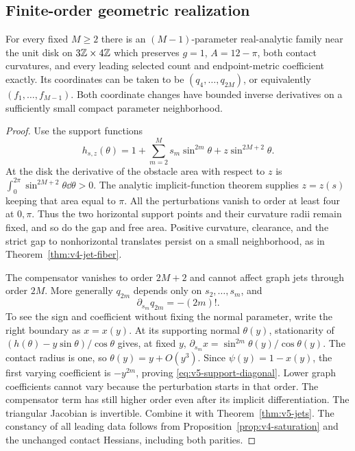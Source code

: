 \subsection{Finite-order geometric realization}
\begin{theorem}
\label{thm:v5-realization}
For every fixed $M\ge2$ there is an $(M-1)$-parameter real-analytic
family near the unit disk on $3\mathbb Z\times4\mathbb Z$ which preserves
$g=1$, $A=12-\pi$, both contact curvatures, and every leading selected
count and endpoint-metric coefficient exactly. Its coordinates can be
taken to be $(q_4,\ldots,q_{2M})$, or equivalently
$(f_1,\ldots,f_{M-1})$. Both coordinate changes have bounded inverse
derivatives on a sufficiently small compact parameter neighborhood.
\end{theorem}
\begin{proof}
Use the support functions
\[
 h_{s,z}(\theta)=1+\sum_{m=2}^M s_m\sin^{2m}\theta
                         +z\sin^{2M+2}\theta.
\]
At the disk the derivative of the obstacle area with respect to $z$ is
$\int_0^{2\pi}\sin^{2M+2}\theta\dd\theta>0$. The analytic implicit-function
theorem supplies $z=z(s)$ keeping that area equal to $\pi$. All the
perturbations vanish to order at least four at $0,\pi$. Thus the two
horizontal support points and their curvature radii remain fixed, and
so do the gap and free area. Positive curvature, clearance, and the
strict gap to nonhorizontal translates persist on a small neighborhood,
as in Theorem~\ref{thm:v4-jet-fiber}.

The compensator vanishes to order $2M+2$ and cannot affect graph jets
through order $2M$. More generally $q_{2m}$ depends only on
$s_2,\ldots,s_m$, and
\begin{equation}\label{eq:v5-support-diagonal}
                 \partial_{s_m}q_{2m}=-(2m)!.
\end{equation}
To see the sign and coefficient without fixing the normal parameter,
write the right boundary as $x=x(y)$. At its supporting normal
$\theta(y)$, stationarity of
$(h(\theta)-y\sin\theta)/\cos\theta$ gives, at fixed $y$,
$\partial_{s_m}x=\sin^{2m}\theta(y)/\cos\theta(y)$.
The contact radius is one, so $\theta(y)=y+O(y^3)$. Since
$\psi(y)=1-x(y)$, the first varying coefficient is $-y^{2m}$,
proving \eqref{eq:v5-support-diagonal}. Lower graph coefficients cannot
vary because the perturbation starts in that order. The compensator
term has still higher order even after its implicit differentiation.
The triangular Jacobian is invertible. Combine it with
Theorem~\ref{thm:v5-jets}. The constancy of all leading data follows
from Proposition~\ref{prop:v4-saturation} and the unchanged contact
Hessians, including both parities.
\end{proof}

